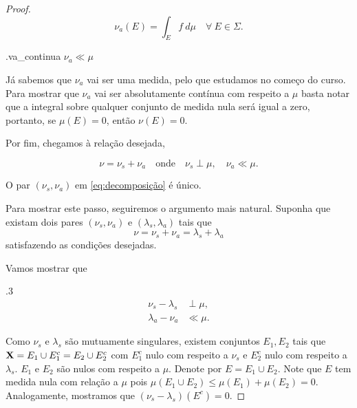 \begin{proof}
    \begin{equation*}
        \nu_a(E)=\int_E f \ d\mu \quad \forall \ E\in \Sigma.
    \end{equation*}

    \begin{claim}{.}{va_continua}
        $\nu_a \ll \mu$
    \end{claim}

    Já sabemos que $\nu_a$ vai ser uma medida, pelo que estudamos no começo do curso. Para mostrar que $\nu_a$ vai ser absolutamente contínua com respeito a $\mu$ basta notar que a integral sobre qualquer conjunto de medida nula será igual a zero, portanto, se $\mu(E)=0$, então $\nu(E)=0$.

    Por fim, chegamos à relação desejada,

    \begin{equation}\label{eq:decomposição}
        \nu = \nu_s + \nu_a\quad \text{onde}\quad \nu_s \perp \mu, \quad \nu_a \ll \mu.
    \end{equation}

    \begin{claim}
        O par $(\nu_s,\nu_a)$ em \eqref{eq:decomposição} é único.
    \end{claim}

    Para mostrar este passo, seguiremos o argumento mais natural. Suponha que existam dois pares $(\nu_s,\nu_a)$ e $(\lambda_s,\lambda_a)$ tais que
    \begin{equation*}
        \nu=\nu_s+\nu_a=\lambda_s+\lambda_a
    \end{equation*}
    satisfazendo as condições desejadas.
    
    Vamos mostrar que

    \begin{claim}{.}{3}
        \begin{eqnarray*}
            \nu_s-\lambda_s &\perp \mu, \\
            \lambda_a-\nu_a &\ll \mu.
        \end{eqnarray*}
    \end{claim}

    Como $\nu_s$ e $\lambda_s$ são mutuamente singulares, existem conjuntos $E_1,E_2$ tais que $\mathbf{X}=E_1\cup E_1^c=E_2\cup E_2^c$ com $E_1^c$ nulo com respeito a $\nu_s$ e $E_2^c$ nulo com respeito a $\lambda_s$. $E_1$ e $E_2$ são nulos com respeito a $\mu$. Denote por $E=E_1 \cup E_2$. Note que $E$ tem medida nula com relação a $\mu$ pois $\mu(E_1\cup E_2)\leq \mu(E_1)+\mu(E_2)=0$. Analogamente, mostramos que $(\nu_s-\lambda_s)(E^c)=0$.


\end{proof}
